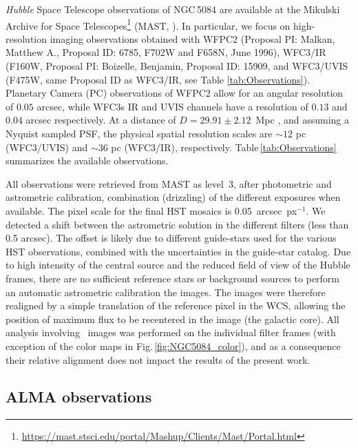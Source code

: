 \documentclass[modern]{CORE-AAS/aastex631}
\begin{document}
\emph{Hubble} Space Telescope observations of NGC\,5084 are available at the Mikulski Archive for Space Telescopes\footnote{\url{https://mast.stsci.edu/portal/Mashup/Clients/Mast/Portal.html}} (MAST, ). In particular, we focus on high-resolution imaging observations obtained with WFPC2 (Proposal PI: Malkan, Matthew A.,
Proposal ID: 6785, F702W and F658N, June 1996), WFC3/IR (F160W, Proposal PI: Boizelle, Benjamin, Proposal ID: 15909, and WFC3/UVIS (F475W, same Proposal ID as WFC3/IR, see Table \ref{tab:Observations}). Planetary Camera (PC) observations of WFPC2 allow for an angular resolution of $0.05$ arcsec, while WFC3s IR and UVIS channels have a resolution of $0.13$ and $0.04$ arcsec respectively. At a distance of $D=	29.91\pm2.12$~Mpc \citep[6.90~arcsec~kpc$^{-1}$,][]{koribalski+2004aj128_16}, and assuming a Nyquist sampled PSF, the physical spatial resolution scales are $\sim12$ pc (WFC3/UVIS) and $\sim36$ pc (WFC3/IR), respectively. Table\,\ref{tab:Observations} summarizes the available observations.



All observations were retrieved from MAST as level~3, after photometric and astrometric calibration, combination (drizzling) of the different exposures when available. The pixel scale for the final HST mosaics is 0.05~arcsec~px$^{-1}$. We detected a shift between the astrometric solution in the different filters (less than 0.5 arcsec). The offset is likely due to different guide-stars used for the various HST observations, combined with the uncertainties in the guide-star catalog. Due to high intensity of the central source and the reduced field of view of the Hubble frames, there are no sufficient reference stars or background sources to perform an automatic astrometric calibration the images. The images were therefore realigned by a simple translation of the reference pixel in the WCS, allowing the position of maximum flux to be recentered in the image (the galactic core). All analysis involving \Hubble\ images was performed on the individual filter frames (with exception of the color maps in Fig.\,\ref{fig:NGC5084_color}), and as a consequence their relative alignment does not impact the results of the present work.

\subsection{ALMA observations} \label{subsec:data_ALMA}
\end{document}

